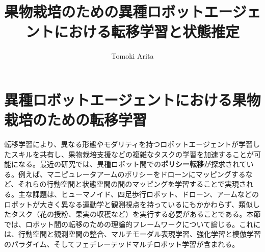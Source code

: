 \documentclass[a4paper,fleqn,10pt,twocolumn]{template_v1.0}
\title{果物栽培のための異種ロボットエージェントにおける転移学習と状態推定}
\author{Tomoki Arita}
\begin{document}
\maketitle


\section{異種ロボットエージェントにおける果物栽培のための転移学習}
転移学習により、異なる形態やモダリティを持つロボットエージェントが学習したスキルを共有し、果物栽培支援などの複雑なタスクの学習を加速することが可能になる。最近の研究では、異種ロボット間での\textbf{ポリシー転移}が探求されている。例えば、マニピュレータアームのポリシーをドローンにマッピングするなど、それらの行動空間と状態空間の間のマッピングを学習することで実現される\cite{Zhu2024}\cite{Zhu2024a}。主な課題は、ヒューマノイド、四足歩行ロボット、ドローン、アームなどのロボットが大きく異なる運動学と観測視点を持っているにもかかわらず、類似したタスク（花の授粉、果実の収穫など）を実行する必要があることである。本節では、ロボット間の転移のための理論的フレームワークについて論じる。これには、行動空間と観測空間の整合、マルチモーダル表現学習、強化学習と模倣学習のパラダイム、そしてフェデレーテッドマルチロボット学習が含まれる。
\end{document}
